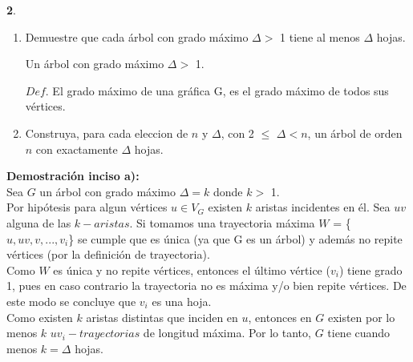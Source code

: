 \documentclass[12pt]{article}
\begin{document}
%
%
\textbf{2}.
\begin{enumerate}[label = $\alph*)$]

    \item Demuestre que cada árbol con grado máximo $\Delta >$ 1 tiene al menos $\Delta$  hojas.\\
    
    \begin{tcolorbox}[title=\textbf{Hipótesis}, colback=red!15!white, colframe=black!]
        
    Un árbol con grado máximo $\Delta >$ 1.
     
    \end{tcolorbox}
        
    \begin{tcolorbox}[title=\textbf{Definiciones}, colback=blue!15!white, colframe=black!]
         $Def$. El grado máximo de una gráfica G, es el grado máximo de todos sus vértices.
    \end{tcolorbox}
     
    \item Construya, para cada eleccion de $n$ y $\Delta$, con 2 $\leq$ $\Delta < n$, un árbol de orden $n$ con exactamente $\Delta$ hojas.
    \end{enumerate}
    
    \textbf{Demostración inciso a):}\\
    
    Sea $G$ un árbol con grado máximo $\Delta = k$ donde $k >$ 1.\\
    
    Por hipótesis para algun vértices $u \in V_G$ existen $k$ aristas incidentes en él. Sea $uv$ alguna de las $k-aristas$. Si tomamos una trayectoria máxima  $W$ = \{$u, uv, v, ... , v_i$\} se cumple que es única (ya que G es un árbol) y además no repite vértices (por la definición de trayectoria). \\
    
    Como $W$ es única  y no repite vértices, entonces el último vértice ($v_i$) tiene grado 1, pues en caso contrario la trayectoria no es máxima y/o bien repite vértices. De este modo se concluye que $v_i$ es una hoja.\\
    
    Como existen $k$ aristas distintas que inciden en $u$, entonces en $G$ existen por lo menos  $k$ $uv_i-trayectorias$ de longitud máxima. Por lo tanto, $G$ tiene cuando menos $k = \Delta$ hojas.\\
    
\end{document}

